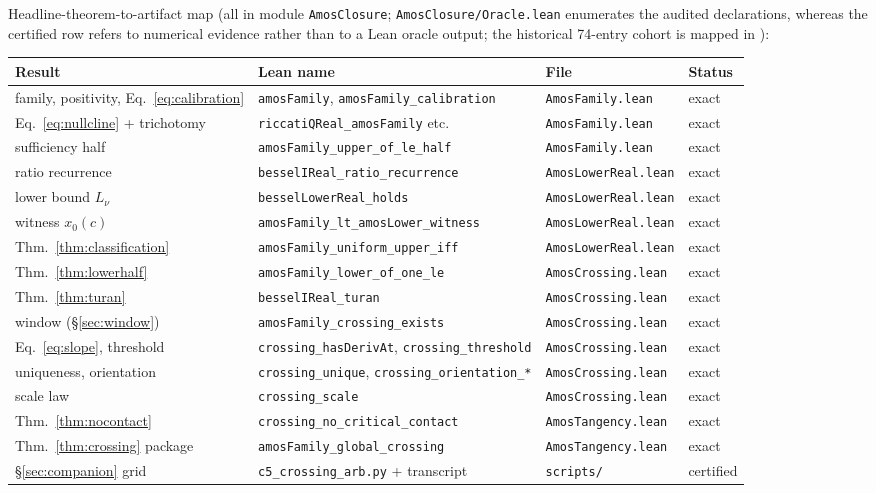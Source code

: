 \documentclass[11pt]{article}
\newcommand{\lean}[1]{\texttt{#1}}
\begin{document}
\medskip
\noindent Headline-theorem-to-artifact map (all in module
\lean{AmosClosure}; \lean{AmosClosure/Oracle.lean} enumerates the
audited declarations, whereas the certified row refers to numerical
evidence rather than to a Lean oracle output; the historical
74-entry cohort is mapped in
\cite{ErikssonC2,ErikssonC3,ErikssonC4}):

\begin{center}
\footnotesize
\begin{tabular}{@{}llll@{}}
\toprule
Result & Lean name & File & Status \\
\midrule
family, positivity, Eq.~\eqref{eq:calibration} & \lean{amosFamily}, \lean{amosFamily\_calibration} & \lean{AmosFamily.lean} & exact \\
Eq.~\eqref{eq:nullcline} + trichotomy & \lean{riccatiQReal\_amosFamily} etc. & \lean{AmosFamily.lean} & exact \\
sufficiency half & \lean{amosFamily\_upper\_of\_le\_half} & \lean{AmosFamily.lean} & exact \\
ratio recurrence & \lean{besselIReal\_ratio\_recurrence} & \lean{AmosLowerReal.lean} & exact \\
lower bound $L_\nu$ & \lean{besselLowerReal\_holds} & \lean{AmosLowerReal.lean} & exact \\
witness $x_0(c)$ & \lean{amosFamily\_lt\_amosLower\_witness} & \lean{AmosLowerReal.lean} & exact \\
Thm.~\ref{thm:classification} & \lean{amosFamily\_uniform\_upper\_iff} & \lean{AmosLowerReal.lean} & exact \\
Thm.~\ref{thm:lowerhalf} & \lean{amosFamily\_lower\_of\_one\_le} & \lean{AmosCrossing.lean} & exact \\
Thm.~\ref{thm:turan} & \lean{besselIReal\_turan} & \lean{AmosCrossing.lean} & exact \\
window (\S\ref{sec:window}) & \lean{amosFamily\_crossing\_exists} & \lean{AmosCrossing.lean} & exact \\
Eq.~\eqref{eq:slope}, threshold & \lean{crossing\_hasDerivAt}, \lean{crossing\_threshold} & \lean{AmosCrossing.lean} & exact \\
uniqueness, orientation & \lean{crossing\_unique}, \lean{crossing\_orientation\_*} & \lean{AmosCrossing.lean} & exact \\
scale law & \lean{crossing\_scale} & \lean{AmosCrossing.lean} & exact \\
Thm.~\ref{thm:nocontact} & \lean{crossing\_no\_critical\_contact} & \lean{AmosTangency.lean} & exact \\
Thm.~\ref{thm:crossing} package & \lean{amosFamily\_global\_crossing} & \lean{AmosTangency.lean} & exact \\
\S\ref{sec:companion} grid & \lean{c5\_crossing\_arb.py} + transcript & \lean{scripts/} & certified \\
\bottomrule
\end{tabular}
\end{center}
\end{document}
